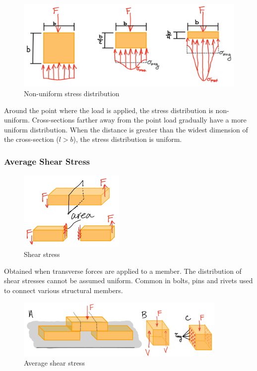 \begin{figure}[!h]
\centering
\includegraphics[angle=0, width=5in]{Stress-Figures/Stress Distribution.png}
\vspace{-2mm}
\caption{\small Non-uniform stress distribution}
\vspace{-3mm}
\label{Fig:StressDist}
\end{figure}

\noindent Around the point where the load is applied, the stress distribution is non-uniform. Cross-sections farther away from the point load gradually have a more uniform distribution. When the distance is greater than the widest dimension of the cross-section ($l > b$), the stress distribution is uniform.

\subsubsection{Average Shear Stress}

\begin{figure}[!h]
\centering
\includegraphics[angle=0, width=2in]{Stress-Figures/Shear Stress.png}
\vspace{-2mm}
\caption{\small Shear stress}
\vspace{-3mm}
\label{Fig:ShearStress}
\end{figure}

\noindent Obtained when transverse forces are applied to a member. The distribution of shear stresses cannot be assumed uniform. Common in bolts, pins and rivets used to connect various structural members.

\begin{figure}[!h]
\centering
\includegraphics[angle=0, width=4in]{Stress-Figures/Avg Shear Stress.png}
\vspace{-2mm}
\caption{\small Average shear stress}
\vspace{-3mm}
\label{Fig:AvgShearStress}
\end{figure}

